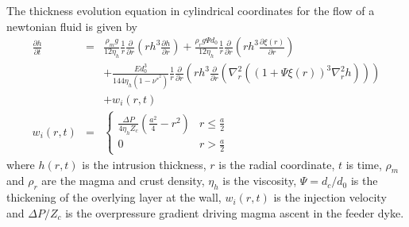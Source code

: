 The thickness  evolution equation  in cylindrical coordinates  for the
flow of a newtonian fluid is given by \citep{Thorey:2014cv}
\begin{eqnarray}
  \frac{\partial         h}{\partial        t}
  &=&\frac{\rho_{m}g}{12  \eta_h} \frac{1}{r}  \frac{\partial}{\partial
      r}\left   (r  h^{3}   \frac{\partial  h}{\partial   r}  \right)+
      \frac{\rho_{r}g\Psi       d_0}{12       \eta_h}       \frac{1}{r}
      \frac{\partial}{\partial r}\left ( r
      h^{3}  \frac{\partial  \xi(r)}{\partial  r}\right )  \nonumber  \\
  &&+ \frac{E d_0^{3}}{144\eta_h
     (1-\nu^*^{2})}\frac{1}{r}\frac{\partial}{\partial  r}\left  (  r
     h^{3}    \frac{\partial}{\partial   r}    \left(\nabla^{2}_{r}
     ((1+\Psi \xi(r))^{3}\nabla^{2}_{r}h )\right)\right )\nonumber\\
  && + w_i(r,t) \label{C6-eq16}\\
  w_i(r,t)&=&
            \begin{cases} \frac{ \Delta P}{4 \eta_h Z_{c}} (\frac{a^{2}}{4}-r^{2})&
              r \le \frac{a}{2}\\ 0 & r > \frac{a}{2}
            \end{cases}
                                      \label{C6-eq12}
\end{eqnarray}
where  $h(r,t)$  is  the  intrusion   thickness,  $r$  is  the  radial
coordinate, $t$ is time, $\rho_m$ and $\rho_r$ are the magma and crust
density, $\eta_h$ is the viscosity,  $\Psi = d_c/d_0$ is the thickening
of the overlying layer at the wall, $w_i(r,t)$ is the injection velocity
and $\Delta P/Z_c$  is the overpressure gradient  driving magma ascent
in the feeder dyke.

